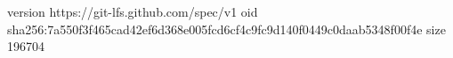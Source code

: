 version https://git-lfs.github.com/spec/v1
oid sha256:7a550f3f465cad42ef6d368e005fcd6cf4c9fc9d140f0449c0daab5348f00f4e
size 196704
